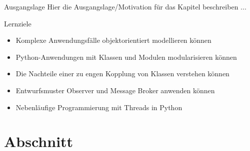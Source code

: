 \begin{frame}{Ausgangslage}
    Hier die Ausgangslage/Motivation für das Kapitel beschreiben ...

\end{frame}

\begin{frame}{Lernziele}
    \begin{itemize}
        \item Komplexe Anwendungsfälle objektorientiert modellieren können
        \item Python-Anwendungen mit Klassen und Modulen modularisieren können
        \item Die Nachteile einer zu engen Kopplung von Klassen verstehen können
        \item Entwurfsmuster Observer und Message Broker anwenden können
        \item Nebenläufige Programmierung mit Threads in Python
    \end{itemize}
\end{frame}


\section{Abschnitt}

